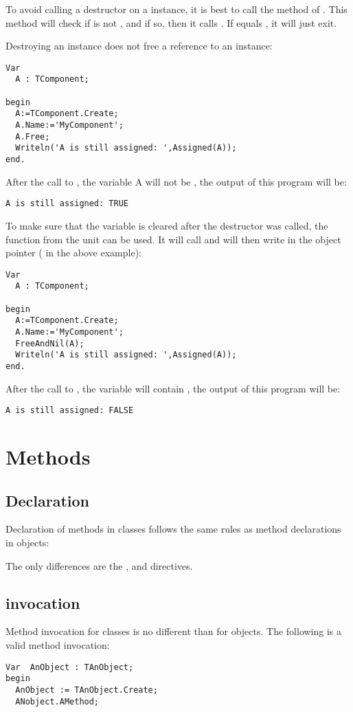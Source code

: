 To avoid calling a destructor on a  instance, it is best to call
the  method of . This method will check if  is not , 
and if so, then it calls . If  equals , it
will just exit.

Destroying an instance does not free a reference to an instance:
\begin{verbatim}
Var
  A : TComponent;

begin
  A:=TComponent.Create;
  A.Name:='MyComponent';
  A.Free;
  Writeln('A is still assigned: ',Assigned(A));
end.
\end{verbatim}
After the call to , the variable A will not be , the
output of this program will be:
\begin{verbatim}
A is still assigned: TRUE
\end{verbatim}
To make sure that the variable  is cleared after the destructor was called,
the function  from the  unit can be used. It
will call  and will then write  in the object pointer (
in the above example):
\begin{verbatim}
Var
  A : TComponent;

begin
  A:=TComponent.Create; 
  A.Name:='MyComponent';
  FreeAndNil(A);
  Writeln('A is still assigned: ',Assigned(A));
end.
\end{verbatim}
After the call to , the variable  will contain , the
output of this program will be:
\begin{verbatim}
A is still assigned: FALSE
\end{verbatim}


\section{Methods}
\subsection{Declaration}
Declaration of methods in classes follows the same rules as method
declarations in objects:

The only differences are the ,  and
 directives.

\subsection{invocation}
Method invocation for classes is no different than for objects. The
following is a valid method invocation:
\begin{verbatim}
Var  AnObject : TAnObject;
begin
  AnObject := TAnObject.Create;
  ANobject.AMethod;
\end{verbatim}


